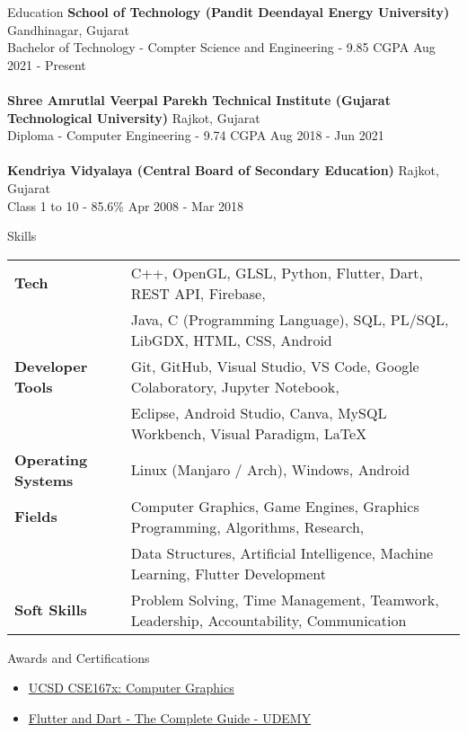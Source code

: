 \documentclass{resume}
\begin{document}
\begin{rSection}{Education}
{\bf School of Technology (Pandit Deendayal Energy University)} \hfill {Gandhinagar, Gujarat}\\
Bachelor of Technology - Compter Science and Engineering - 9.85 CGPA \hfill {Aug 2021 - Present}\\
\\
{\bf Shree Amrutlal Veerpal Parekh Technical Institute (Gujarat Technological University)} \hfill {Rajkot, Gujarat}\\
Diploma - Computer Engineering - 9.74 CGPA \hfill {Aug 2018 - Jun 2021}\\
\\
{\bf Kendriya Vidyalaya (Central Board of Secondary Education)} \hfill {Rajkot, Gujarat}\\
Class 1 to 10 - 85.6\% \hfill {Apr 2008 - Mar 2018}
\end{rSection}

\begin{rSection}{Skills}
\begin{tabular}{ @{} >{\bfseries}l @{\hspace{5ex}} l }
Tech 
& C++, OpenGL, GLSL, Python, Flutter, Dart, REST API, Firebase, \\ 
& Java, C (Programming Language), SQL, PL/SQL, LibGDX, HTML, CSS, Android
\\
Developer Tools 
& Git, GitHub, Visual Studio, VS Code, Google Colaboratory, Jupyter Notebook, \\
& Eclipse, Android Studio, Canva, MySQL Workbench, Visual Paradigm, LaTeX
\\
Operating Systems 
& Linux (Manjaro / Arch), Windows, Android
\\
Fields 
& Computer Graphics, Game Engines, Graphics Programming, Algorithms, Research, \\
& Data Structures, Artificial Intelligence, Machine Learning, Flutter Development
\\
Soft Skills 
& Problem Solving, Time Management, Teamwork, Leadership, Accountability, Communication
\end{tabular}
\end{rSection}

\begin{rSection}{Awards and Certifications} 
\begin{itemize}
    \item   \href{https://courses.edx.org/certificates/3e47add62a6b45269149bf91b91f1399}{UCSD CSE167x: Computer Graphics}
    \item   \href{https://www.udemy.com/certificate/UC-2fce7723-1cc7-403d-a54b-09dbd5cd495e/}{Flutter and Dart - The Complete Guide - UDEMY}
\end{itemize}
\end{rSection}
\end{document}
